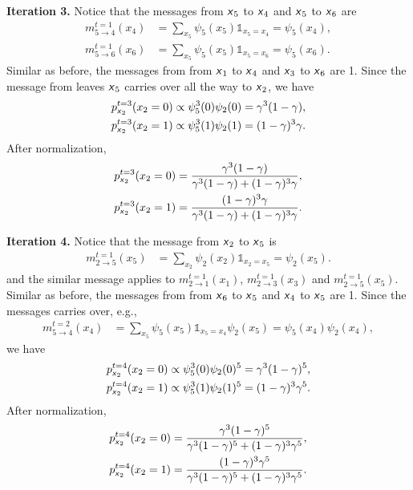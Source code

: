 \documentclass{article}
\newcommand{\s}[1]{\textsf{\textit{#1}}}
\begin{document}
\noindent
\textbf{Iteration 3.} Notice that the messages from $\s{x}_5$ to $\s{x}_4$ and
$\s{x}_5$ to $\s{x}_6$ are
%
\begin{align*}
	m^{t=1}_{5\to4}(x_4) &= \sum_{x_5}\psi_5(x_5)\mathds{1}_{x_5 = x_4} = \psi_5(x_4),\\
	m^{t=1}_{5\to6}(x_6) &= \sum_{x_5}\psi_5(x_5)\mathds{1}_{x_5 = x_6} = \psi_5(x_6).
\end{align*}
%
Similar as before, the messages from from $\s{x}_1$ to $\s{x}_4$ and $\s{x}_3$ to $\s{x}_6$ are 1.
%
Since the message from leaves $\s{x}_5$ carries over all the way to $\s{x}_2$, we have
%
\begin{align}
	p^{t=3}_{\s{x}_2}(x_2=0) \propto \psi_5^3(0)\psi_2(0) = \gamma^3(1 - \gamma),\\
	p^{t=3}_{\s{x}_2}(x_2=1) \propto \psi_5^3(1)\psi_2(1) = (1 - \gamma)^3\gamma.
\end{align}
%
After normalization,
\begin{align}
	p^{t=3}_{\s{x}_2}(x_2=0) = 
		\frac{\gamma^3(1 - \gamma)}{\gamma^3(1 - \gamma) + (1 - \gamma)^3\gamma},\\
	p^{t=3}_{\s{x}_2}(x_2=1) =
		\frac{(1 - \gamma)^3\gamma}{{\gamma^3(1 - \gamma) + (1 - \gamma)^3\gamma}}.
\end{align}

\noindent
\textbf{Iteration 4.} Notice that the message from $\s{x}_2$ to $\s{x}_5$ is
\begin{align*}
	m^{t=1}_{2\to5}(x_5) &= \sum_{x_2}\psi_2(x_2)\mathds{1}_{x_2 = x_5} = \psi_2(x_5).
\end{align*}
%
and the similar message applies to $m^{t=1}_{2\to1}(x_1)$,
$m^{t=1}_{2\to3}(x_3)$ and $m^{t=1}_{2\to5}(x_5)$.
%
Similar as before, the messages from from $\s{x}_6$ to $\s{x}_5$
and $\s{x}_4$ to $\s{x}_5$ are 1.
%
Since the messages carries over, e.g.,
\begin{align*}
	m^{t=2}_{5\to4}(x_4) &= \sum_{x_5}\psi_5(x_5)\mathds{1}_{x_5 = x_4}\psi_2(x_5)
	= \psi_5(x_4)\psi_2(x_4),
\end{align*}
%
we have
\begin{align}
	p^{t=4}_{\s{x}_2}(x_2=0) \propto \psi_5^3(0)\psi_2(0)^5 = \gamma^3(1 - \gamma)^5,\\
	p^{t=4}_{\s{x}_2}(x_2=1) \propto \psi_5^3(1)\psi_2(1)^5 = (1 - \gamma)^3\gamma^5.
\end{align}
%
After normalization,
\begin{align}
	p^{t=4}_{\s{x}_2}(x_2=0) = 
		\frac{\gamma^3(1 - \gamma)^5}{\gamma^3(1 - \gamma)^5 + (1 - \gamma)^3\gamma^5},\\
	p^{t=4}_{\s{x}_2}(x_2=1) =
		\frac{(1 - \gamma)^3\gamma^5}{{\gamma^3(1 - \gamma)^5 + (1 - \gamma)^3\gamma^5}}.
\end{align}
\\
\end{document}
